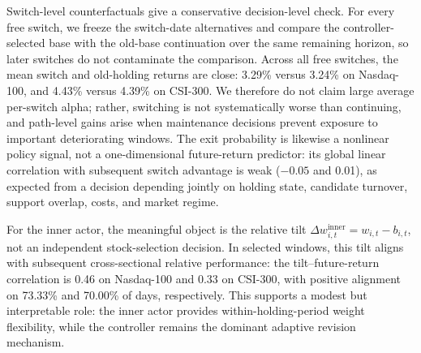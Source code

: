 \documentclass[letterpaper]{article} %
\begin{document}
Switch-level counterfactuals give a conservative decision-level check. For every free switch, we freeze the switch-date alternatives and compare the controller-selected base with the old-base continuation over the same remaining horizon, so later switches do not contaminate the comparison. Across all free switches, the mean switch and old-holding returns are close: 3.29\% versus 3.24\% on Nasdaq-100, and 4.43\% versus 4.39\% on CSI-300. We therefore do not claim large average per-switch alpha; rather, switching is not systematically worse than continuing, and path-level gains arise when maintenance decisions prevent exposure to important deteriorating windows. The exit probability is likewise a nonlinear policy signal, not a one-dimensional future-return predictor: its global linear correlation with subsequent switch advantage is weak (\(-0.05\) and 0.01), as expected from a decision depending jointly on holding state, candidate turnover, support overlap, costs, and market regime.

For the inner actor, the meaningful object is the relative tilt \(\Delta w_{i,t}^{\mathrm{inner}}=w_{i,t}-b_{i,t}\), not an independent stock-selection decision. In selected windows, this tilt aligns with subsequent cross-sectional relative performance: the tilt--future-return correlation is 0.46 on Nasdaq-100 and 0.33 on CSI-300, with positive alignment on 73.33\% and 70.00\% of days, respectively. This supports a modest but interpretable role: the inner actor provides within-holding-period weight flexibility, while the controller remains the dominant adaptive revision mechanism.

\FloatBarrier
\raggedbottom


% 
\end{document}
